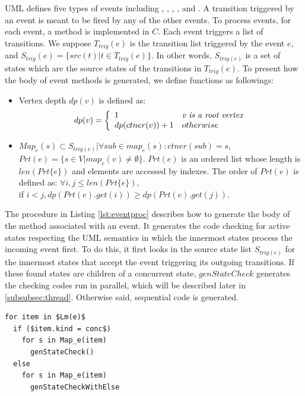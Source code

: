 UML defines five types of events including , , , , and . A transition triggered by an  event is meant to be fired by any of the other events. To process events, for each event, a method is implemented in $C$. Each event triggers a list of transitions. We suppose $T_{trig}(e)$ is the transition list triggered by the event $e$, and $S_{trig}(e) = \{src(t) | t \in T_{trig}(e)\}$. In other words, $S_{trig(e)}$ is a set of states which are the source states of the transitions in $T_{trig}(e)$. To present how the body of event methods is generated, we define functions as followings:
\begin{itemize}
	\item Vertex depth $dp(v)$ is defined as:
			\begin{equation}
			dp(v) =    \left\{
			\begin{array}{ll}
			1 & \textit{v is a root vertex}  \\
			dp(ctner(v)) + 1& otherwise \\
			\end{array} 
			\right.
			\end{equation}
	\item $Map_{e}(s) \subset S_{trig(e)} | \forall sub \in map_e(s): ctner(sub) = s$, $Prt(e) = \{s \in V| map_{e}(v) \neq \emptyset\}$. $Prt(e)$ is an ordered list whose length is $len(Prt\{e\})$ and elements are accessed by indexes. The order of $Prt(e)$ is defined as:	$\forall i, j \leq len(Prt\{e\})$, 
	\\ if $i < j, dp(Prt(e).get(i)) \geq dp(Prt(e).get(j))$. 	
\end{itemize}


The procedure in Listing \ref{lst:eventproc} describes how to generate the body of the method associated with an event. It generates the code checking for active states respecting the UML semantics in which the innermost states process the incoming event first. To do this, it first looks in the source state list $S_{trig(e)}$ for the innermost states that accept the event triggering its outgoing transitions. If these found states are children of a concurrent state, $genStateCheck$ generates the checking codes run in parallel, which will be described later in \ref{subsubsec:thread}. Otherwise said, sequential code is generated.

\begin{lstlisting}[mathescape=true, caption=Procedure to create code event processing, label=lst:eventproc, frame=single]
for item in $Lm(e)$
  if ($item.kind = conc$)
    for s in Map_e(item)
      genStateCheck() 
  else 
    for s in Map_e(item)
      genStateCheckWithElse  	
\end{lstlisting}



